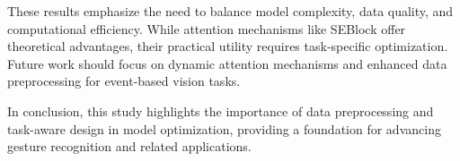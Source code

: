 \documentclass[conference]{IEEEtran}
\begin{document}
These results emphasize the need to balance model complexity, data quality, and computational efficiency. While attention mechanisms like SEBlock offer theoretical advantages, their practical utility requires task-specific optimization. Future work should focus on dynamic attention mechanisms and enhanced data preprocessing for event-based vision tasks.

In conclusion, this study highlights the importance of data preprocessing and task-aware design in model optimization, providing a foundation for advancing gesture recognition and related applications.


\end{document}
